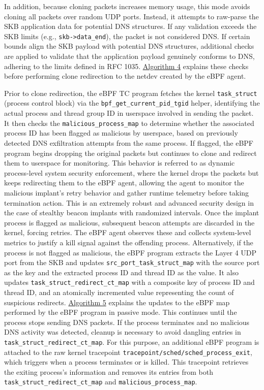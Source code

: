 \documentclass [11pt, proquest] {uwthesis}[2020/02/24]
\begin{document}
In addition, because cloning packets increases memory usage, this mode avoids cloning all packets over random UDP ports. Instead, it attempts to raw-parse the SKB application data for potential DNS structures. If any validation exceeds the SKB limits (e.g., \texttt{skb->data\_end}), the packet is not considered DNS. If certain bounds align the SKB payload with potential DNS structures, additional checks are applied to validate that the application payload genuinely conforms to DNS, adhering to the limits defined in RFC 1035. \hyperref[sec:alg4]{Algorithm 4} explains these checks before performing clone redirection to the netdev created by the eBPF agent.

Prior to clone redirection, the eBPF TC program fetches the kernel \texttt{task\_struct} (process control block) via the \texttt{bpf\_get\_current\_pid\_tgid} helper, identifying the actual process and thread group ID in userspace involved in sending the packet. It then checks the \texttt{malicious\_process\_map} to determine whether the associated process ID has been flagged as malicious by userspace, based on previously detected DNS exfiltration attempts from the same process. If flagged, the eBPF program begins dropping the original packets but continues to clone and redirect them to userspace for monitoring. This behavior is referred to as dynamic process-level system security enforcement, where the kernel drops the packets but keeps redirecting them to the eBPF agent, allowing the agent to monitor the malicious implant’s retry behavior and gather runtime telemetry before taking termination action. This is an extremely robust and advanced security design in the case of stealthy beacon implants with randomized intervals. Once the implant process is flagged as malicious, subsequent beacon attempts are discarded in the kernel, forcing retries. The eBPF agent observes these and collects system-level metrics to justify a kill signal against the offending process. Alternatively, if the process is not flagged as malicious, the eBPF program extracts the Layer 4 UDP port from the SKB and updates \texttt{src\_port\_task\_struct\_map} with the source port as the key and the extracted process ID and thread ID as the value. It also updates \texttt{task\_struct\_redirect\_ct\_map} with a composite key of process ID and thread ID, and an atomically incremented value representing the count of suspicious redirects. \hyperref[sec:alg5]{Algorithm 5} explains the updates to the eBPF map performed by the eBPF program in passive mode.
This continues until the process stops sending DNS packets. If the process terminates and no malicious DNS activity was detected, cleanup is necessary to avoid dangling entries in \texttt{task\_struct\_redirect\_ct\_map}. For this purpose, an additional eBPF program is attached to the raw kernel tracepoint \texttt{tracepoint/sched/sched\_process\_exit}, which triggers when a process terminates or is killed. This tracepoint retrieves the exiting process’s information and removes its entries from both \texttt{task\_struct\_redirect\_ct\_map} and \texttt{malicious\_process\_map}.
\end{document}
